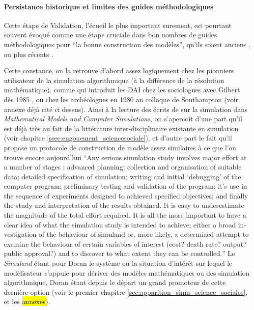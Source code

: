 \paragraph{Persistance historique et limites des guides méthodologiques}

Cette étape de Validation, l'écueil le plus important surement, est pourtant souvent évoqué comme une étape cruciale dans bon nombres de guides méthodologiques pour \enquote{la bonne construction des modèles}, qu'ils soient anciens \autocites[195]{Beshers1965}{Guetzkow1972, Dutton1971,Naylor1966, Naylor1967}, ou plus récents \autocite{Amblard2006, Gilbert2008}.

Cette constance, on la retrouve d'abord assez logiquement chez les pionniers utilisateur de la simulation algorithmique (à la différence de la résolution mathématique), comme \textcite{Doran1975, Doran1986} qui introduit les DAI chez les sociologues avec Gilbert dès 1985 \autocite{Gilbert1985}, ou chez les archéologues en 1980 au colloque de Southampton \autocites{Doran1982, Renfrew1982} (voir annexe déjà cité ci dessus). Ainsi à la lecture des écrits de \textcite[300-301]{Doran1975} sur la simulation dans \textit{Mathematical Models and Computer Simulations}, on s'apercoit d'une part qu'il est déjà très au fait de la littérature inter-disciplinaire existante en simulation \autocite{Guetzkow1972} (voir chapitre \ref{ssec:engouement_sciencesociale}), et d'autre part le fait qu'il propose un protocole de construction de modèle assez similaires à ce que l'on trouve encore aujourd'hui \foreignquote{english}{Any serious simulation study involves major effort at a number of stages : advanced planning; collection and organisation of suitable data; detailed specification of simulation; writing and initial \enquote{debugging} of the computer program; preliminary testing and validation of the program; it's use in the sequence of experiments designed to achieved specified objectives; and finally the study and interpretation of the results obtained. It is easy to underestimate the magnitude of the total effort required. It is all the more important to have a clear idea of what the simulation study is intended to achieve; either a broad investigation of the behaviour of simuland or, more likely, a determined attempt to examine the behaviour of certain variables of interest (cost? death rate? output? public approval?) and to discover to what extent they can be controlled.} Le \textit{Simuland} étant pour Doran le système ou la situation d'intérêt sur lequel le modélisateur s'appuie pour dériver des modèles mathématiques ou des simulation algorithmique, Doran étant depuis le départ \autocite{Doran1970} un grand promoteur de cette dernière option (voir le premier chapitre \ref{sec:apparition_simu_science_sociales}, et les \hl{annexes}).

